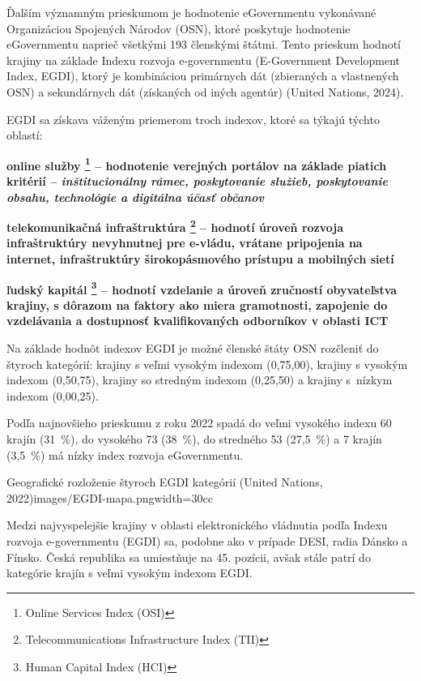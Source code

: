 Ďalším významným prieskumom je hodnotenie eGovernmentu vykonávané Organizáciou Spojených Národov (OSN), ktoré poskytuje hodnotenie eGovernmentu  naprieč všetkými 193 členskými štátmi. Tento prieskum hodnotí krajiny na základe Indexu rozvoja e-governmentu (E-Government Development Index, EGDI), ktorý je kombináciou primárnych dát (zbieraných a vlastnených OSN) a sekundárnych dát (získaných od iných agentúr) \scr(United Nations, 2024).

\blank
EGDI sa získava váženým priemerom troch indexov, ktoré sa týkajú týchto oblastí:

\startitemize
\item{\start\bf online služby \stop \footnote{Online Services Index (OSI)} -- hodnotenie verejných portálov na základe piatich kritérií -- \start\it inštitucionálny rámec, poskytovanie služieb, poskytovanie obsahu, technológie a digitálna účasť občanov\stop}
\item{\start\bf telekomunikačná infraštruktúra  \stop \footnote{Telecommunications Infrastructure Index (TII)} -- hodnotí úroveň rozvoja infraštruktúry nevyhnutnej pre e-vládu, vrátane pripojenia na internet, infraštruktúry širokopásmového prístupu a mobilných sietí}
\item{\start\bf ľudský kapitál \stop \footnote{Human Capital Index (HCI)} -- hodnotí vzdelanie a úroveň zručností obyvateľstva krajiny, s dôrazom na faktory ako miera gramotnosti, zapojenie do vzdelávania a dostupnosť kvalifikovaných odborníkov v oblasti ICT} %
\stopitemize 

Na základe hodnôt indexov EGDI je možné členské štáty OSN rozčleniť do štyroch kategórií: krajiny s veľmi vysokým indexom (0,75,00), krajiny s vysokým indexom (0,50,75), krajiny so stredným indexom (0,25,50) a krajiny s~nízkym indexom (0,00,25).

Podľa najnovšieho prieskumu z roku 2022 spadá do veľmi vysokého indexu 60 krajín (31~\%), do vysokého 73 (38~\%), do stredného 53 (27,5~\%) a 7 krajín (3,5~\%) má nízky index rozvoja eGovernmentu.

{Geografické rozloženie štyroch EGDI kategórií (United Nations, 2022)}{images/EGDI-mapa.png}{width=30cc}

Medzi najvyspelejšie krajiny v oblasti elektronického vládnutia podľa Indexu rozvoja e-governmentu (EGDI) sa, podobne ako v prípade DESI, radia Dánsko a Fínsko. Česká republika sa umiestňuje na 45. pozícii, avšak stále patrí do kategórie krajín s veľmi vysokým indexom EGDI.

